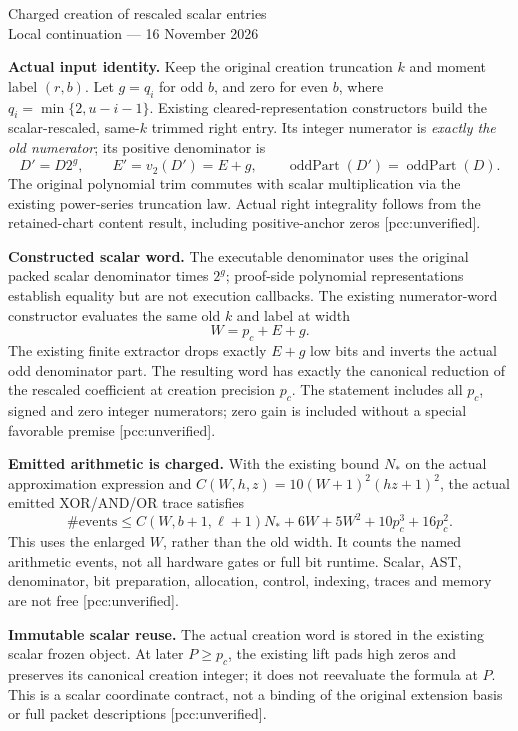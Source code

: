 \documentclass[10pt]{article}
\begin{document}
\begin{center}{\Large Charged creation of rescaled scalar entries}\\[4pt]
Local continuation --- 16 November 2026\end{center}
\textbf{Actual input identity.} Keep the original creation truncation $k$
and moment label $(r,b)$. Let $g=q_i$ for odd $b$, and zero for even $b$,
where $q_i=\min\{2,u-i-1\}$. Existing cleared-representation constructors
build the scalar-rescaled, same-$k$ trimmed right entry. Its integer
numerator is \emph{exactly the old numerator}; its positive denominator is
\[
 D'=D2^g,\qquad E'=v_2(D')=E+g,\qquad
 \operatorname{oddPart}(D')=\operatorname{oddPart}(D).
\]
The original polynomial trim commutes with scalar multiplication via the
existing power-series truncation law. Actual right integrality follows
from the retained-chart content result, including positive-anchor zeros
[pcc:unverified].

\textbf{Constructed scalar word.} The executable denominator uses the
original packed scalar denominator times $2^g$; proof-side polynomial
representations establish equality but are not execution callbacks.
The existing numerator-word constructor evaluates the same old $k$ and
label at width
\[
 W=p_c+E+g.
\]
The existing finite extractor drops exactly $E+g$ low bits and inverts the
actual odd denominator part. The resulting word has exactly the canonical
reduction of the rescaled coefficient at creation precision $p_c$.
The statement includes all $p_c$, signed and zero integer numerators;
zero gain is included without a special favorable premise
[pcc:unverified].

\textbf{Emitted arithmetic is charged.} With the existing bound $N_*$ on
the actual approximation expression and
$C(W,h,z)=10(W+1)^2(hz+1)^2$, the actual emitted XOR/AND/OR trace satisfies
\[
 \#\mathrm{events}\le C(W,b+1,\ell+1)N_*+6W+5W^2
                   +10p_c^3+16p_c^2.
\]
This uses the enlarged $W$, rather than the old width. It counts the named
arithmetic events, not all hardware gates or full bit runtime. Scalar,
AST, denominator, bit preparation, allocation, control, indexing, traces
and memory are not free [pcc:unverified].

\textbf{Immutable scalar reuse.} The actual creation word is stored in
the existing scalar frozen object. At later $P\ge p_c$, the existing lift
pads high zeros and preserves its canonical creation integer; it does not
reevaluate the formula at $P$. This is a scalar coordinate contract, not a
binding of the original extension basis or full packet descriptions
[pcc:unverified].
\end{document}
